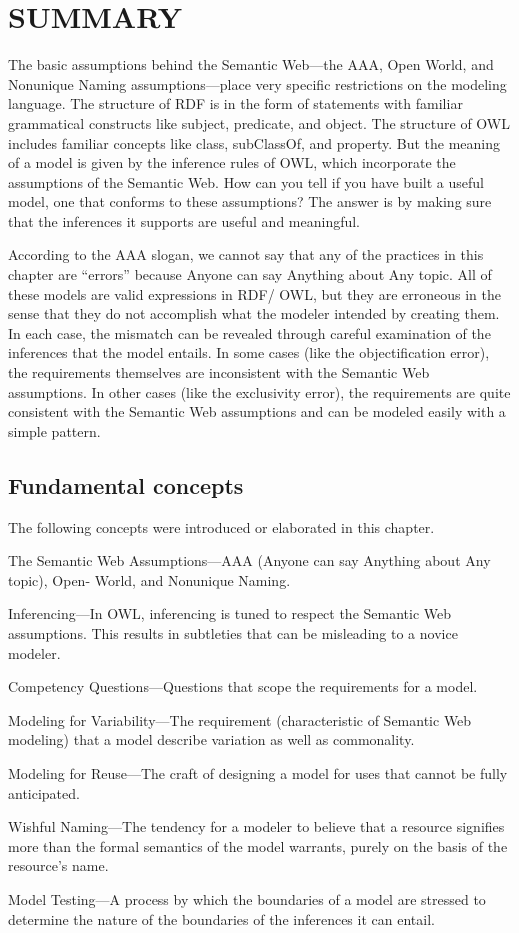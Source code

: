\section{SUMMARY}

The basic assumptions behind the Semantic Web---the AAA, Open World, and
Nonunique Naming assumptions---place very specific restrictions on the
modeling language. The structure of RDF is in the form of statements
with familiar grammatical constructs like subject, predicate, and
object. The structure of OWL includes familiar concepts like class,
subClassOf, and property. But the meaning of a model is given by the
inference rules of OWL, which incorporate the assumptions of the
Semantic Web. How can you tell if you have built a useful model, one
that conforms to these assumptions? The answer is by making sure that
the inferences it supports are useful and meaningful.

According to the AAA slogan, we cannot say that any of the practices in
this chapter are ``errors'' because Anyone can say Anything about Any
topic. All of these models are valid expressions in RDF/ OWL, but they
are erroneous in the sense that they do not accomplish what the modeler
intended by creating them. In each case, the mismatch can be revealed
through careful examination of the inferences that the model entails. In
some cases (like the objectification error), the requirements themselves
are inconsistent with the Semantic Web assumptions. In other cases (like
the exclusivity error), the requirements are quite consistent with the
Semantic Web assumptions and can be modeled easily with a simple
pattern.

\subsection{Fundamental concepts}

The following concepts were introduced or elaborated in this chapter.

The Semantic Web Assumptions---AAA (Anyone can say Anything about Any
topic), Open- World, and Nonunique Naming.

Inferencing---In OWL, inferencing is tuned to respect the Semantic Web
assumptions. This results in subtleties that can be misleading to a
novice modeler.

Competency Questions---Questions that scope the requirements for a
model.

Modeling for Variability---The requirement (characteristic of Semantic
Web modeling) that a model describe variation as well as commonality.

Modeling for Reuse---The craft of designing a model for uses that cannot
be fully anticipated.

Wishful Naming---The tendency for a modeler to believe that a resource
signifies more than the formal semantics of the model warrants, purely
on the basis of the resource's name.

Model Testing---A process by which the boundaries of a model are
stressed to determine the nature of the boundaries of the inferences it
can entail.

